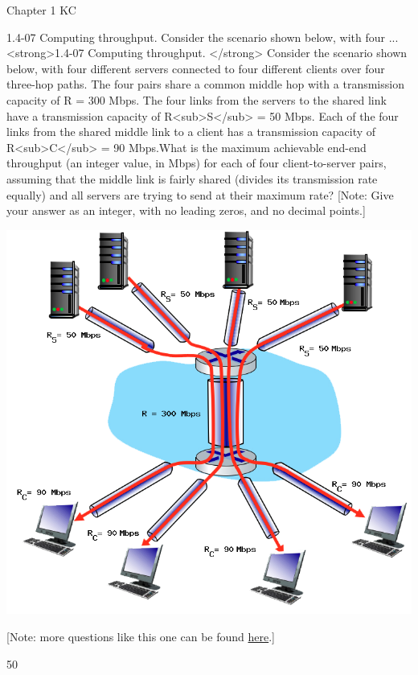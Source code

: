 \documentclass[a4paper]{article}
\begin{document}
\begin{quiz}{Chapter 1 KC}
\begin{shortanswer}[points=1]{1.4-07 Computing throughput.  Consider the scenario shown below, with four ...}
<strong>1.4-07 Computing throughput. </strong> Consider the scenario shown below, with four different servers connected to four different clients over four three-hop paths. The four pairs share a common middle hop with a transmission capacity of R = 300 Mbps. The four links from the servers to the shared link have a transmission capacity of R<sub>S</sub> = 50 Mbps. Each of the four links from the shared middle link to a client has a transmission capacity of R<sub>C</sub> = 90 Mbps.What is the maximum achievable end-end throughput (an integer value, in Mbps) for each of four client-to-server pairs, assuming that the middle link is fairly shared (divides its transmission rate equally) and all servers are trying to send at their maximum rate? [Note: Give your answer as an integer, with no leading zeros, and no decimal points.] 
\begin{center}
\includegraphics[width=\linewidth]{figs/1.4.7.png}
\end{center}
 [Note: more questions like this one can be found \href{http://gaia.cs.umass.edu/kurose_ross/interactive/end-end-throughput-simple.php}{here}.]
\item* 50
\item *
\end{shortanswer}


\end{quiz}
\end{document}

